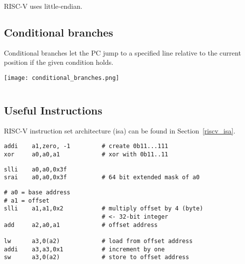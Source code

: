 RISC-V uses little-endian.


\subsection{Conditional branches}
Conditional branches let the PC jump to a specified line relative to the current position if the given condition holds.

\texttt{[image: conditional\_branches.png]}

\begin{lstlisting}[language={[RISC-V]Assembler}]

\end{lstlisting}


\subsection{Useful Instructions}
RISC-V instruction set architecture (isa)  can be found in Section\ \ref{riscv_isa}.

\newpar{}

\begin{lstlisting}[language={[RISC-V]Assembler}]
addi    a1,zero, -1         # create 0b11...111
xor     a0,a0,a1            # xor with 0b11..11
\end{lstlisting}

\newpar{}

\begin{lstlisting}[language={[RISC-V]Assembler}]
slli    a0,a0,0x3f      
srai    a0,a0,0x3f          # 64 bit extended mask of a0
\end{lstlisting}

\newpar{}

\begin{lstlisting}[language={[RISC-V]Assembler}]
# a0 = base address
# a1 = offset
slli    a1,a1,0x2           # multiply offset by 4 (byte) 
                            # <- 32-bit integer
add     a2,a0,a1            # offset address

lw      a3,0(a2)            # load from offset address
addi    a3,a3,0x1           # increment by one
sw      a3,0(a2)            # store to offset address
\end{lstlisting}